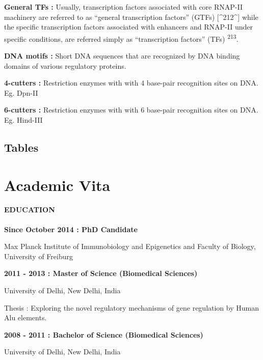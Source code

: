 \documentclass[11pt,twoside]{MPIthesis}
\theoremstyle{definition}
\theoremstyle{definition}
\theoremstyle{definition}
\theoremstyle{remark}
\begin{document}
\textbf{General TFs :} Usually, transcription factors associated with
core RNAP-II machinery are referred to as ``general transcription
factors'' (GTFs) {[}\^{}212\^{}{]} while the specific transcription
factors associated with enhancers and RNAP-II under specific conditions,
are referred simply as ``transcription factors'' (TFs)
\textsuperscript{213}.

\textbf{DNA motifs :} Short DNA sequences that are recognized by DNA
binding domains of various regulatory proteins.

\textbf{4-cutters :} Restriction enzymes with with 4 base-pair
recognition sites on DNA. Eg. Dpn-II

\textbf{6-cutters :} Restriction enzymes with with 6 base-pair
recognition sites on DNA. Eg. Hind-III

\section{Tables}\label{tables}





\chapter{Academic Vita}\label{academic-vita}


\subsubsection{EDUCATION}\label{education}

\textbf{Since October 2014 : PhD Candidate}

Max Planck Institute of Immunobiology and Epigenetics and Faculty of
Biology, University of Freiburg

\textbf{2011 - 2013 : Master of Science (Biomedical Sciences)}

University of Delhi, New Delhi, India

Thesis : Exploring the novel regulatory mechanisms of gene regulation by
Human Alu elements.

\textbf{2008 - 2011 : Bachelor of Science (Biomedical Sciences)}

University of Delhi, New Delhi, India
\end{document}
